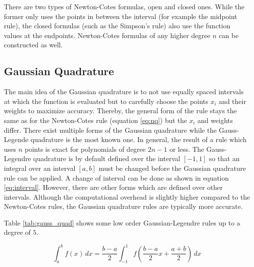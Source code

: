 There are two types of Newton-Cotes formulas, open and closed ones. While the former only uses the points in between the interval (for example the midpoint rule), the closed formulas (such as the Simpson's rule) also use the function values at the endpoints. Newton-Cotes formulas of any higher degree $n$ can be constructed as well. \cite{Wiki_Cotes} 


\subsection{Gaussian Quadrature}\label{sec:gauss_quad}
The main idea of the Gaussian quadrature is to not use equally spaced intervals at which the function is evaluated but to carefully choose the points $x_i$ and their weights to maximize accuracy. Thereby, the general form of the rule stays the same as for the Newton-Cotes rule (equation \ref{eq:nq}) but the $x_i$ and weights differ. There exist multiple forms of the Gaussian quadrature while the Gauss-Legende quadrature is the most known one. In general, the result of a rule which uses $n$ points is exact for polynomials of degree $2n-1$ or less. The Gauss-Legendre quadrature is by default defined over the interval $[-1, 1]$ so that an integral over an interval $[a, b]$ must be changed before the Gaussian quadrature rule can be applied. A change of interval can be done as shown in equation \ref{eq:interval}. However, there are other forms which are defined over other intervals. Although the computational overhead is slightly higher compared to the Newton-Cotes rules, the Gaussian quadrature rules are typically more accurate.  \cite{wiki:gauss}

Table \ref{tab:gauss_quad} shows some low order Gaussian-Legendre rules up to a degree of $5$.


\begin{equation}
\int_a^b f(x)\,dx = \frac{b-a}{2} \int_{-1}^1 f\left(\frac{b-a}{2}x + \frac{a+b}{2}\right)\,dx
\label{eq:interval}
\end{equation}


